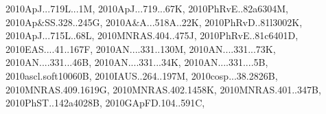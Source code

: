 \documentclass[12pt]{article}
\begin{document}
\begin{description}
{2010ApJ...719L...1M,%
2010ApJ...719...67K,%
2010PhRvE..82a6304M,%
2010Ap&SS.328..245G,%
2010A&A...518A..22K,%
2010PhRvD..81l3002K,%
2010ApJ...715L..68L,%
2010MNRAS.404..475J,%
2010PhRvE..81c6401D,%
2010EAS....41..167F,%
2010AN....331..130M,%
2010AN....331...73K,%
2010AN....331...46B,%
2010AN....331...34K,%
2010AN....331....5B,%
2010ascl.soft10060B,%
2010IAUS..264..197M,%
2010cosp...38.2826B,%
2010MNRAS.409.1619G,%
2010MNRAS.402.1458K,%
2010MNRAS.401..347B,%
2010PhST..142a4028B,%
2010GApFD.104..591C,%
}
\end{description}
\end{document}
